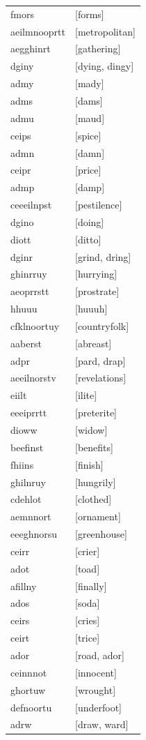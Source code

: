 \documentclass{article}
\begin{document}
\begin{tabular}{ll}
fmors & [forms] \\
aeilmnooprtt & [metropolitan] \\
aegghinrt & [gathering] \\
dginy & [dying, dingy] \\
admy & [mady] \\
adms & [dams] \\
admu & [maud] \\
ceips & [spice] \\
admn & [damn] \\
ceipr & [price] \\
admp & [damp] \\
ceeeilnpst & [pestilence] \\
dgino & [doing] \\
diott & [ditto] \\
dginr & [grind, dring] \\
ghinrruy & [hurrying] \\
aeoprrstt & [prostrate] \\
hhuuu & [huuuh] \\
cfklnoortuy & [countryfolk] \\
aaberst & [abreast] \\
adpr & [pard, drap] \\
aeeilnorstv & [revelations] \\
eiilt & [ilite] \\
eeeiprrtt & [preterite] \\
dioww & [widow] \\
beefinst & [benefits] \\
fhiins & [finish] \\
ghilnruy & [hungrily] \\
cdehlot & [clothed] \\
aemnnort & [ornament] \\
eeeghnorsu & [greenhouse] \\
ceirr & [crier] \\
adot & [toad] \\
afillny & [finally] \\
ados & [soda] \\
ceirs & [cries] \\
ceirt & [trice] \\
ador & [road, ador] \\
ceinnnot & [innocent] \\
ghortuw & [wrought] \\
defnoortu & [underfoot] \\
adrw & [draw, ward] \\

\end{tabular}
\end{document}

